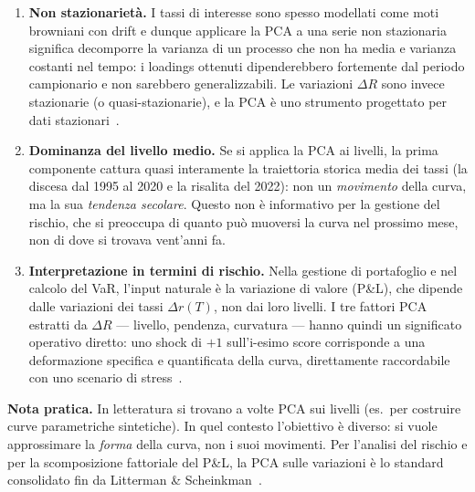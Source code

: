 \documentclass[11pt,a4paper]{article}
\theoremstyle{plain}
\theoremstyle{definition}
\theoremstyle{remark}
\begin{document}
\begin{enumerate}
  \item \textbf{Non stazionarietà.}
        I tassi di interesse sono spesso modellati come moti browniani con drift e dunque applicare la PCA a una serie
        non stazionaria significa decomporre la varianza di un processo che
        non ha media e varianza costanti nel tempo: i loadings ottenuti
        dipenderebbero fortemente dal periodo campionario e non sarebbero
        generalizzabili. Le variazioni $\Delta R$ sono invece stazionarie
        (o quasi-stazionarie), e la PCA è uno strumento progettato per dati
        stazionari~\cite{litterman1991}.

  \item \textbf{Dominanza del livello medio.}
        Se si applica la PCA ai livelli, la prima componente cattura quasi
        interamente la traiettoria storica media dei tassi (la discesa dal 1995
        al 2020 e la risalita del 2022): non un \emph{movimento} della curva,
        ma la sua \emph{tendenza secolare}. Questo non è informativo per la
        gestione del rischio, che si preoccupa di quanto può muoversi la curva
        nel prossimo mese, non di dove si trovava vent'anni fa.

  \item \textbf{Interpretazione in termini di rischio.}
        Nella gestione di portafoglio e nel calcolo del VaR, l'input naturale
        è la variazione di valore (P\&L), che dipende dalle variazioni dei tassi
        $\Delta r(T)$, non dai loro livelli. I tre fattori PCA estratti da
        $\Delta R$ --- livello, pendenza, curvatura --- hanno quindi un
        significato operativo diretto: uno shock di $+1$ sull'i-esimo score
        corrisponde a una deformazione specifica e quantificata della curva,
        direttamente raccordabile con uno scenario di stress~\cite{rebonato2004}.
\end{enumerate}

\begin{warningbox}
\textbf{Nota pratica.} In letteratura si trovano a volte PCA sui livelli (es.\ per
costruire curve parametriche sintetiche). In quel contesto l'obiettivo è diverso:
si vuole approssimare la \emph{forma} della curva, non i suoi movimenti. Per
l'analisi del rischio e per la scomposizione fattoriale del P\&L, la PCA sulle
variazioni è lo standard consolidato fin da Litterman \& Scheinkman~\cite{litterman1991}.
\end{warningbox}
\end{document}
